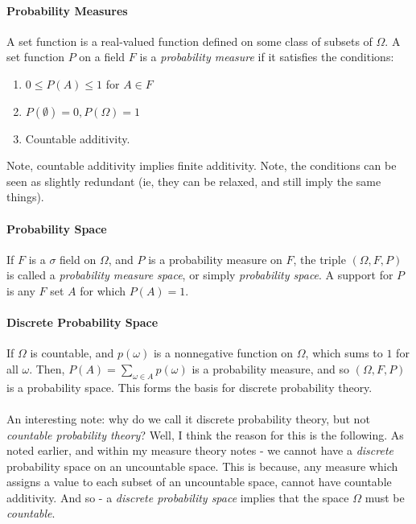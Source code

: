 \documentclass[12pt,a4paper]{article}
\newcommand{\1}[1]{\mathbbm{1}\left\{ #1 \right\}}
\begin{document}
\paragraph{Probability Measures} A set function is a real-valued function defined on some class of subsets of $\Omega$. A set function $P$ on a field $F$ is a \textit{probability measure} if it satisfies the conditions:
\begin{enumerate}
	\item $0 \leq P(A) \leq 1$ for $A \in F$
	\item $P(\emptyset) = 0, P(\Omega) = 1$
	\item Countable additivity.
\end{enumerate}
Note, countable additivity implies finite additivity. Note, the conditions can be seen as slightly redundant (ie, they can be relaxed, and still imply the same things).

\paragraph{Probability Space} If $F$ is a $\sigma$ field on $\Omega$, and $P$ is a probability measure on $F$, the triple $(\Omega,F,P)$ is called a \textit{probability measure space}, or simply \textit{probability space}. A support for $P$ is any $F$ set $A$ for which $P(A) = 1$.

\paragraph{Discrete Probability Space} If $\Omega$ is countable, and $p(\omega)$ is a nonnegative function on $\Omega$, which sums to $1$ for all $\omega$. Then, $P(A) = \sum_{\omega \in A} p(\omega)$ is a probability measure, and so $(\Omega,F,P)$ is a probability space. This forms the basis for discrete probability theory.
\\\\
An interesting note: why do we call it discrete probability theory, but not \textit{countable probability theory}? Well, I think the reason for this is the following. As noted earlier, and within my measure theory notes - we cannot have a \textit{discrete} probability space on an uncountable space. This is because, any measure which assigns a value to each subset of an uncountable space, cannot have countable additivity. And so - a \textit{discrete probability space} implies that the space $\Omega$ must be \textit{countable}.
\end{document}
